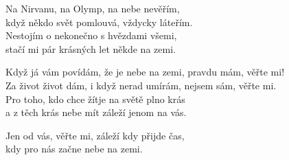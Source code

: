  
\vspace{10pt}

\nv{}Na Nirvanu, na Olymp, na nebe nevěřím,\\
když někdo svět pomlouvá, vždycky láteřím.\\
Nestojím o nekonečno s hvězdami všemi,\\
stačí mi pár krásných let někde na zemi.
\vnv

\nv Když já vám povídám, že je nebe na zemi, pravdu mám, věřte mi!\\
Za život život dám, i když nerad umírám, nejsem sám, věřte mi.\\
\nv Pro toho, kdo chce  žít\mm {}je na světě plno krás\\
a z těch krás nebe mít záleží jenom na vás.
\vnv

\nv Jen od vás, věřte mi, záleží kdy přijde čas,\\
kdy pro nás začne nebe na zemi.
\newpage